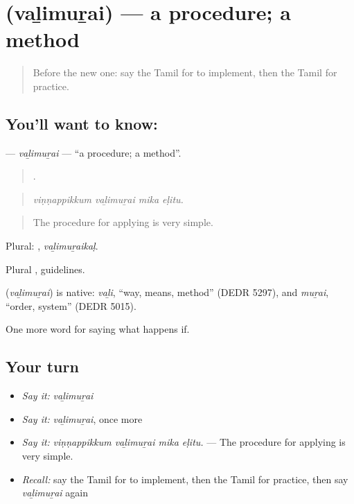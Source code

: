 \section[\texorpdfstring{\ta{வழிமுறை} (vaḻimuṟai)}{வழிமுறை (vaḻimuṟai)}]{ (vaḻimuṟai) — a procedure; a method}

\label{lesson:TA-C389-valimurai}



\begin{quote}
Before the new one: say the Tamil for to implement, then the Tamil for practice.
\end{quote}

\subsection*{You'll want to know: }
\textbf{} — \emph{vaḻimuṟai} — \textquotedblleft{}a procedure; a method\textquotedblright{}.

\begin{quote}
   .
\end{quote}

\begin{quote}
\emph{viṇṇappikkum vaḻimuṟai mika eḷitu.}
\end{quote}

\begin{quote}
The procedure for applying is very simple.
\end{quote}

Plural: , \emph{vaḻimuṟaikaḷ}.

Plural , guidelines.

\begin{cousinweb}
\textbf{} (\emph{vaḻimuṟai}) is native: \emph{vaḻi}, \textquotedblleft{}way, means, method\textquotedblright{} (DEDR 5297), and \emph{muṟai}, \textquotedblleft{}order, system\textquotedblright{} (DEDR 5015).
\end{cousinweb}

\begin{grammarlens}[title={What you've built}]
One more word for saying what happens if.
\end{grammarlens}

\subsection*{Your turn}
\begin{itemize}
\raggedright
  \item \emph{Say it:} \emph{vaḻimuṟai}
  \item \emph{Say it:} \emph{vaḻimuṟai}, once more
  \item \emph{Say it:} \emph{viṇṇappikkum vaḻimuṟai mika eḷitu.} — The procedure for applying is very simple.
  \item \emph{Recall:} say the Tamil for to implement, then the Tamil for practice, then say \emph{vaḻimuṟai} again
\end{itemize}

